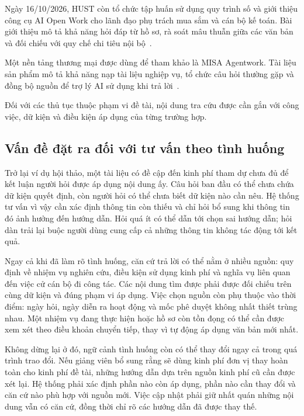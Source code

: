 Ngày 16/10/2026, HUST còn tổ chức tập huấn sử dụng quy trình số và giới thiệu
công cụ AI Open Work cho lãnh đạo phụ trách mua sắm và cán bộ kế toán. Bài
giới thiệu mô tả khả năng hỏi đáp từ hồ sơ, rà soát mâu thuẫn giữa các văn
bản và đối chiếu với quy chế chi tiêu nội bộ~\cite{hust2026quytrinhso}.

Một nền tảng thương mại được dùng để tham khảo là MISA Agentwork. Tài liệu
sản phẩm mô tả khả năng nạp tài liệu nghiệp vụ, tổ chức câu hỏi thường gặp
và đồng bộ nguồn để trợ lý AI sử dụng khi trả lời~\cite{misa2026trithuc}.

Đối với các thủ tục thuộc phạm vi đề tài, nội dung tra cứu được cần gắn
với công việc, dữ kiện và điều kiện áp dụng của từng trường hợp.

\subsection{Vấn đề đặt ra đối với tư vấn theo tình huống}
Trở lại ví dụ hội thảo, một tài liệu có đề cập đến kinh phí tham dự chưa đủ
để kết luận người hỏi được áp dụng nội dung ấy. Câu hỏi ban đầu có thể chưa
chứa dữ kiện quyết định, còn người hỏi có thể chưa biết dữ kiện nào cần nêu.
Hệ thống tư vấn vì vậy cần xác định thông tin còn thiếu và chỉ hỏi bổ sung
khi thông tin đó ảnh hưởng đến hướng dẫn. Hỏi quá ít có thể dẫn tới chọn
sai hướng dẫn; hỏi dàn trải lại buộc người dùng cung cấp cả những thông tin
không tác động tới kết quả.

Ngay cả khi đã làm rõ tình huống, căn cứ trả lời có thể nằm ở nhiều nguồn:
quy định về nhiệm vụ nghiên cứu, điều kiện sử dụng kinh phí và nghĩa vụ liên
quan đến việc cử cán bộ đi công tác. Các nội dung tìm được phải được đối
chiếu trên cùng dữ kiện và đúng phạm vi áp dụng. Việc chọn nguồn còn phụ
thuộc vào thời điểm: ngày hỏi, ngày diễn ra hoạt động và mốc phê duyệt không
nhất thiết trùng nhau. Một nhiệm vụ đang thực hiện hoặc hồ sơ còn tồn đọng
có thể cần được xem xét theo điều khoản chuyển tiếp, thay vì tự động áp dụng
văn bản mới nhất.

Không dừng lại ở đó, ngữ cảnh tình huống còn có thể thay đổi ngay cả trong quá trình trao đổi. 
Nếu giảng viên bổ sung rằng sẽ dùng kinh phí đơn vị thay hoàn toàn cho kinh phí đề tài, những
hướng dẫn dựa trên nguồn kinh phí cũ cần được xét lại. Hệ thống phải xác
định phần nào còn áp dụng, phần nào cần thay đổi và căn cứ nào phù hợp với
nguồn mới. Việc cập nhật phải giữ nhất quán những nội dung vẫn có căn cứ,
đồng thời chỉ rõ các hướng dẫn đã được thay thế.

